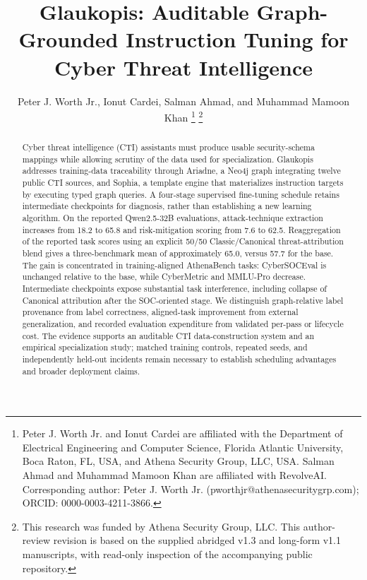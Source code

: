 \documentclass[journal]{IEEEtran}
\begin{document}
\title{Glaukopis: Auditable Graph-Grounded Instruction Tuning for Cyber Threat Intelligence}
\author{Peter J. Worth Jr., Ionut Cardei, Salman Ahmad, and Muhammad Mamoon Khan%
\thanks{Peter J. Worth Jr. and Ionut Cardei are affiliated with the Department of Electrical Engineering and Computer Science, Florida Atlantic University, Boca Raton, FL, USA, and Athena Security Group, LLC, USA. Salman Ahmad and Muhammad Mamoon Khan are affiliated with RevolveAI. Corresponding author: Peter J. Worth Jr. (pworthjr@athenasecuritygrp.com); ORCID: 0000-0003-4211-3866.}%
\thanks{This research was funded by Athena Security Group, LLC. This author-review revision is based on the supplied abridged v1.3 and long-form v1.1 manuscripts, with read-only inspection of the accompanying public repository.}}
\maketitle
\begin{abstract}
Cyber threat intelligence (CTI) assistants must produce usable security-schema mappings while allowing scrutiny of the data used for specialization. Glaukopis addresses training-data traceability through Ariadne, a Neo4j graph integrating twelve public CTI sources, and Sophia, a template engine that materializes instruction targets by executing typed graph queries. A four-stage supervised fine-tuning schedule retains intermediate checkpoints for diagnosis, rather than establishing a new learning algorithm. On the reported Qwen2.5-32B evaluations, attack-technique extraction increases from 18.2 to 65.8 and risk-mitigation scoring from 7.6 to 62.5. Reaggregation of the reported task scores using an explicit 50/50 Classic/Canonical threat-attribution blend gives a three-benchmark mean of approximately 65.0, versus 57.7 for the base. The gain is concentrated in training-aligned AthenaBench tasks: CyberSOCEval is unchanged relative to the base, while CyberMetric and MMLU-Pro decrease. Intermediate checkpoints expose substantial task interference, including collapse of Canonical attribution after the SOC-oriented stage. We distinguish graph-relative label provenance from label correctness, aligned-task improvement from external generalization, and recorded evaluation expenditure from validated per-pass or lifecycle cost. The evidence supports an auditable CTI data-construction system and an empirical specialization study; matched training controls, repeated seeds, and independently held-out incidents remain necessary to establish scheduling advantages and broader deployment claims.
\end{abstract}
\end{document}
